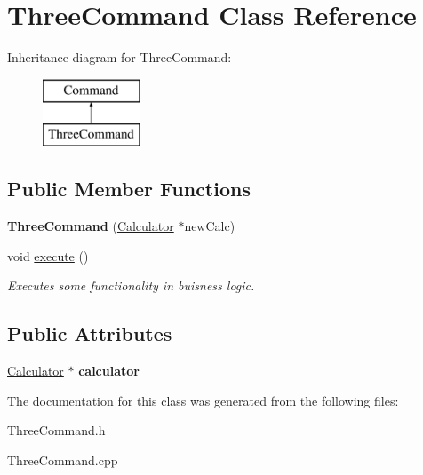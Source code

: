 \hypertarget{class_three_command}{}\section{Three\+Command Class Reference}
\label{class_three_command}
Inheritance diagram for Three\+Command\+:\begin{figure}[H]
\begin{center}
\leavevmode
\includegraphics[height=2.000000cm]{class_three_command}
\end{center}
\end{figure}
\subsection*{Public Member Functions}
\begin{DoxyCompactItemize}
\item 
\hypertarget{class_three_command_a6d1887ffb18cd3772b9164d68e86b72c}{}{\bfseries Three\+Command} (\hyperlink{class_calculator}{Calculator} $\ast$new\+Calc)\label{class_three_command_a6d1887ffb18cd3772b9164d68e86b72c}

\item 
\hypertarget{class_three_command_af8e301161be213f999f4fd49ffa4db67}{}void \hyperlink{class_three_command_af8e301161be213f999f4fd49ffa4db67}{execute} ()\label{class_three_command_af8e301161be213f999f4fd49ffa4db67}

\begin{DoxyCompactList}\small\item\em Executes some functionality in buisness logic. \end{DoxyCompactList}\end{DoxyCompactItemize}
\subsection*{Public Attributes}
\begin{DoxyCompactItemize}
\item 
\hypertarget{class_three_command_a8a2a28c69c47a9e7d65a0b487c41596a}{}\hyperlink{class_calculator}{Calculator} $\ast$ {\bfseries calculator}\label{class_three_command_a8a2a28c69c47a9e7d65a0b487c41596a}

\end{DoxyCompactItemize}


The documentation for this class was generated from the following files\+:\begin{DoxyCompactItemize}
\item 
Three\+Command.\+h\item 
Three\+Command.\+cpp\end{DoxyCompactItemize}
